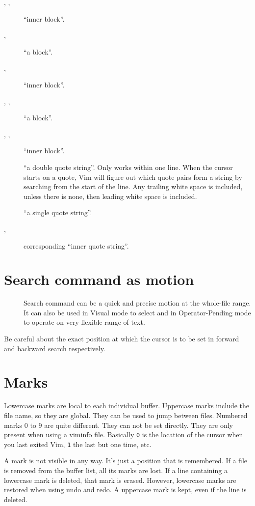 \documentclass{article}
\newcommand{\syntax}[1]{\PVerb{#1}}
\newcommand{\dq}[1]{``#1''}
\begin{document}
\begin{description}
  \item[\vphantom{(}\syntax{i)}, \syntax{i(}\vphantom{)}, \syntax{ib}] \dq{inner block}.
  \item[\syntax{a>}, \syntax{a<}] \dq{a \syntax{<>} block}.
  \item[\syntax{i>}, \syntax{i<}] \dq{inner \syntax{<>} block}.
  \item[, , \syntax{ab}] \dq{a block}.
  \item[, , \syntax{ib}] \dq{inner block}.
  \item[\syntax{a"}] \dq{a double quote string}. Only works within one line. When the cursor starts on a quote, Vim will figure out which quote pairs form a string by searching from the start of the line. Any trailing white space is included, unless there is none, then leading white space is included.
  \item[\syntax{a'}] \dq{a single quote string}.
  \item[\syntax{i"}, \syntax{i'}] corresponding \dq{inner quote string}.
\end{description}

\section{Search command as motion}
\begin{description}
  \item[\syntax{/,?,n,N}] Search command can be a quick and precise motion at the whole-file range. It can also be used in Visual mode to select and in Operator-Pending mode to operate on very flexible range of text.
\end{description}
Be careful about the exact position at which the cursor is to be set in forward and backward search respectively.
\section{Marks}
Lowercase marks are local to each individual buffer. Uppercase marks include the file name, so they are global. They can be used to jump between files.
Numbered marks 0 to 9 are quite different.  They can not be set directly. They are only present when using a viminfo file.
Basically \verb|0| is the location of the cursor when you last exited Vim, \verb|1| the last but one
time, etc.

A mark is not visible in any way. It's just a position that is remembered.
If a file is removed from the buffer list, all its marks are lost.
If a line containing a lowercase mark is deleted, that mark is erased.
However, lowercase marks are restored when using undo and redo.
A uppercase mark is kept, even if the line is deleted.
\end{document}
